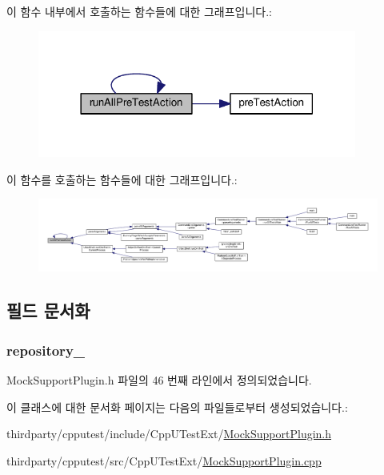 이 함수 내부에서 호출하는 함수들에 대한 그래프입니다.\+:
\nopagebreak
\begin{figure}[H]
\begin{center}
\leavevmode
\includegraphics[width=297pt]{class_test_plugin_aa3524b10b0f1613104fa75f1c1a72cf6_cgraph}
\end{center}
\end{figure}




이 함수를 호출하는 함수들에 대한 그래프입니다.\+:
\nopagebreak
\begin{figure}[H]
\begin{center}
\leavevmode
\includegraphics[width=350pt]{class_test_plugin_aa3524b10b0f1613104fa75f1c1a72cf6_icgraph}
\end{center}
\end{figure}




\subsection{필드 문서화}
\subsubsection[{\texorpdfstring{repository\+\_\+}{repository_}}]{ repository\+\_\+\hspace{0.3cm}{\ttfamily [private]}}\hypertarget{class_mock_support_plugin_af733b473d75ae3a1508c9e862f66e6d3}{}\label{class_mock_support_plugin_af733b473d75ae3a1508c9e862f66e6d3}


Mock\+Support\+Plugin.\+h 파일의 46 번째 라인에서 정의되었습니다.



이 클래스에 대한 문서화 페이지는 다음의 파일들로부터 생성되었습니다.\+:\begin{DoxyCompactItemize}
\item 
thirdparty/cpputest/include/\+Cpp\+U\+Test\+Ext/\hyperlink{_mock_support_plugin_8h}{Mock\+Support\+Plugin.\+h}\item 
thirdparty/cpputest/src/\+Cpp\+U\+Test\+Ext/\hyperlink{_mock_support_plugin_8cpp}{Mock\+Support\+Plugin.\+cpp}\end{DoxyCompactItemize}

